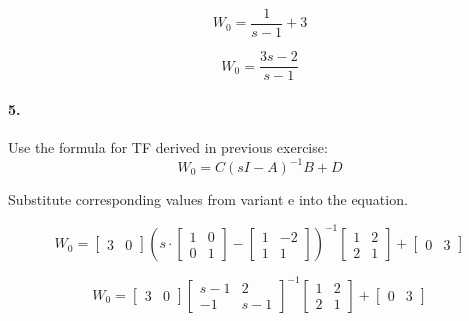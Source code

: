 \documentclass{article}
\begin{document}
        $$W_0 = \frac{1}{s-1} + 3$$
        
        $$W_0 = \frac{3s - 2}{s-1}$$
        
        
    
    
    \paragraph{5.}
        Use the formula for TF derived in previous exercise:
        $$W_0 = C(sI-A)^{-1}B + D$$
 
        Substitute corresponding values from variant e into the equation.
        
        $$W_0 = 
            \begin{bmatrix}
                3 & 0
            \end{bmatrix} (s \cdot
            \begin{bmatrix}
                1 & 0\\
                0 & 1
            \end{bmatrix} - 
            \begin{bmatrix}
                1 & -2\\
                1 & 1
            \end{bmatrix})^{-1}
            \begin{bmatrix}
                1 & 2\\
                2 & 1
            \end{bmatrix} + 
            \begin{bmatrix}
                0 & 3
            \end{bmatrix}$$
       
        $$W_0 = 
            \begin{bmatrix}
                3 & 0
            \end{bmatrix}
            \begin{bmatrix}
                s - 1 & 2\\
                -1 & s - 1
            \end{bmatrix}^{-1}
            \begin{bmatrix}
                1 & 2\\
                2 & 1
            \end{bmatrix} + 
            \begin{bmatrix}
                0 & 3
            \end{bmatrix}$$
            
\end{document}
